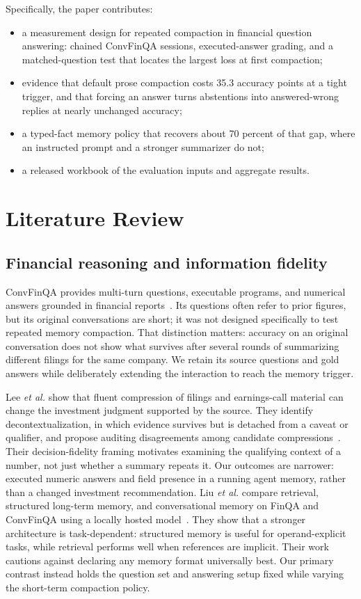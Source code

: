 \documentclass[conference,a4paper]{IEEEtran}
\begin{document}
Specifically, the paper contributes:
\begin{itemize}
\item a measurement design for repeated compaction in financial question answering: chained ConvFinQA sessions, executed-answer grading, and a matched-question test that locates the largest loss at first compaction;
\item evidence that default prose compaction costs 35.3 accuracy points at a tight trigger, and that forcing an answer turns abstentions into answered-wrong replies at nearly unchanged accuracy;
\item a typed-fact memory policy that recovers about 70 percent of that gap, where an instructed prompt and a stronger summarizer do not;
\item a released workbook of the evaluation inputs and aggregate results.
\end{itemize}

\section{Literature Review}

\subsection{Financial reasoning and information fidelity}

ConvFinQA provides multi-turn questions, executable programs, and numerical answers grounded in financial reports~\cite{chen2022convfinqa}. Its questions often refer to prior figures, but its original conversations are short; it was not designed specifically to test repeated memory compaction. That distinction matters: accuracy on an original conversation does not show what survives after several rounds of summarizing different filings for the same company. We retain its source questions and gold answers while deliberately extending the interaction to reach the memory trigger.

Lee \emph{et al.} show that fluent compression of filings and earnings-call material can change the investment judgment supported by the source. They identify decontextualization, in which evidence survives but is detached from a caveat or qualifier, and propose auditing disagreements among candidate compressions~\cite{lee2026summaries}. Their decision-fidelity framing motivates examining the qualifying context of a number, not just whether a summary repeats it. Our outcomes are narrower: executed numeric answers and field presence in a running agent memory, rather than a changed investment recommendation. Liu \emph{et al.} compare retrieval, structured long-term memory, and conversational memory on FinQA and ConvFinQA using a locally hosted model~\cite{liu2026architecture}. They show that a stronger architecture is task-dependent: structured memory is useful for operand-explicit tasks, while retrieval performs well when references are implicit. Their work cautions against declaring any memory format universally best. Our primary contrast instead holds the question set and answering setup fixed while varying the short-term compaction policy.
\end{document}
